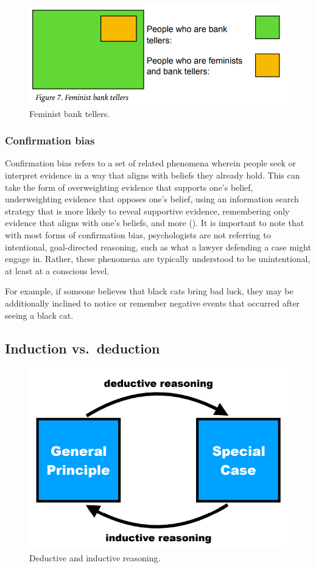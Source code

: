 \documentclass[
]{krantz}
\begin{document}
\begin{figure}

{\centering \includegraphics[width=0.6\linewidth]{images/ch9/fig5} 

}

\caption{Feminist bank tellers.}\label{fig:bank}
\end{figure}

\subsubsection*{Confirmation bias}\label{confirmation-bias-1}


Confirmation bias refers to a set of related phenomena wherein people seek or interpret evidence in a way that aligns with beliefs they already hold. This can take the form of overweighting evidence that supports one's belief, underweighting evidence that opposes one's belief, using an information search strategy that is more likely to reveal supportive evidence, remembering only evidence that aligns with one's beliefs, and more (). It is important to note that with most forms of confirmation bias, psychologists are not referring to intentional, goal-directed reasoning, such as what a lawyer defending a case might engage in. Rather, these phenomena are typically understood to be unintentional, at least at a conscious level.

For example, if someone believes that black cats bring bad luck, they may be additionally inclined to notice or remember negative events that occurred after seeing a black cat.

\subsection*{Induction vs.~deduction}\label{induction-vs.-deduction}


\begin{figure}

{\centering \includegraphics[width=0.6\linewidth]{images/ch9/fig6} 

}

\caption{Deductive and inductive reasoning.}\label{fig:reasoning}
\end{figure}
\end{document}
